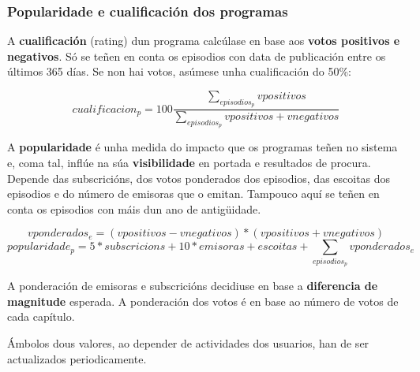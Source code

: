 \subsubsection{Popularidade e cualificación dos programas}

A \textbf{cualificación} (rating) dun programa calcúlase en base aos \textbf{votos positivos e negativos}. Só se teñen en conta os episodios con data de publicación entre os últimos 365 días. Se non hai votos, asúmese unha cualificación do 50\%:

\[cualificacion_{p}=100\frac{\sum_{episodios_p}vpositivos}{\sum_{episodios_p}vpositivos+vnegativos}\]

A \textbf{popularidade} é unha medida do impacto que os programas teñen no sistema e, coma tal, inflúe na súa \textbf{visibilidade} en portada e resultados de procura. Depende das subscricións, dos votos ponderados dos episodios, das escoitas dos episodios e do número de emisoras que o emitan. Tampouco aquí se teñen en conta os episodios con máis dun ano de antigüidade.

\[vponderados_e=(vpositivos-vnegativos)*(vpositivos+vnegativos)\]
\[popularidade_{p}=5*subscricions+10*emisoras+escoitas+\sum_{episodios_p}vponderados_e\]

A ponderación de emisoras e subscricións decidiuse en base a \textbf{diferencia de magnitude} esperada. A ponderación dos votos é en base ao número de votos de cada capítulo.

Ámbolos dous valores, ao depender de actividades dos usuarios, han de ser actualizados periodicamente.


